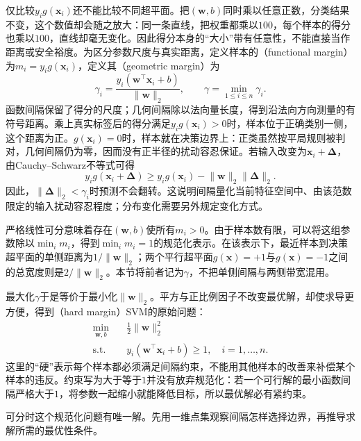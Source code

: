 仅比较$y_i g(\bm{x}_i)$还不能比较不同超平面。把$(\bm{w},b)$同时乘以任意正数，分类结果不变，这个数值却会随之放大：同一条直线，把权重都乘以$100$，每个样本的得分也乘以$100$，直线却毫无变化。因此得分本身的“大小”带有任意性，不能直接当作距离或安全裕度。为区分参数尺度与真实距离，定义样本的（functional margin）为$m_i=y_i g(\bm{x}_i)$，定义其（geometric margin）为
\begin{equation}
  \gamma_i
  =\frac{y_i(\bm{w}^{\top}\bm{x}_i+b)}
         {\lVert\bm{w}\rVert_2},
  \qquad
  \gamma=\min_{1\le i\le n}\gamma_i.
  \label{eq:classification-svm-margin}
\end{equation}
函数间隔保留了得分的尺度；几何间隔除以法向量长度，得到沿法向方向测量的有符号距离。乘上真实标签后的得分满足$y_i g(\bm x_i)>0$时，样本位于正确类别一侧，这个距离为正。$g(\bm x_i)=0$时，样本就在决策边界上：正类虽然按平局规则被判对，几何间隔仍为零，因而没有正半径的扰动容忍保证。若输入改变为$\bm{x}_i+\bm{\Delta}$，由Cauchy--Schwarz不等式可得
\[
  y_i g(\bm{x}_i+\bm{\Delta})
  \ge y_i g(\bm{x}_i)
      -\lVert\bm{w}\rVert_2\lVert\bm{\Delta}\rVert_2.
\]
因此，$\lVert\bm{\Delta}\rVert_2<\gamma_i$时预测不会翻转。这说明间隔量化当前特征空间中、由该范数限定的输入扰动容忍程度；分布变化需要另外规定变化方式。

严格线性可分意味着存在$(\bm{w},b)$使所有$m_i>0$。由于样本数有限，可以将这组参数除以$\min_i m_i$，得到$\min_i m_i=1$的规范化表示。在该表示下，最近样本到决策超平面的单侧距离为$1/\lVert\bm{w}\rVert_2$；两个平行超平面$g(\bm{x})=+1$与$g(\bm{x})=-1$之间的总宽度则是$2/\lVert\bm{w}\rVert_2$。本节将前者记为$\gamma$，不把单侧间隔与两侧带宽混用。

最大化$\gamma$于是等价于最小化$\lVert\bm{w}\rVert_2$。平方与正比例因子不改变最优解，却使求导更方便，得到（hard margin）SVM的原始问题：
\begin{equation}
  \begin{aligned}
    \min_{\bm{w},b}\quad&
      \frac12\lVert\bm{w}\rVert_2^2\\
    \text{s.t.}\quad&
      y_i(\bm{w}^{\top}\bm{x}_i+b)\ge1,
      \quad i=1,\ldots,n.
  \end{aligned}
  \label{eq:classification-svm-hard-primal}
\end{equation}
这里的“硬”表示每个样本都必须满足间隔约束，不能用其他样本的改善来补偿某个样本的违反。约束写为大于等于$1$并没有放弃规范化：若一个可行解的最小函数间隔严格大于$1$，将参数一起缩小就能降低目标，所以最优解必有紧约束。

可分时这个规范化问题有唯一解。先用一维点集观察间隔怎样选择边界，再推导求解所需的最优性条件。


